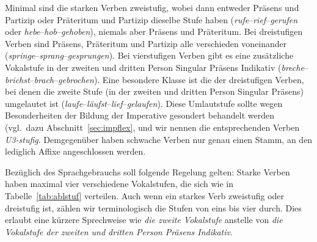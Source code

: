 Minimal sind die starken Verben zweistufig, wobei dann entweder Präsens und Partizip oder Präteritum und Partizip dieselbe Stufe haben (\textit{rufe}--\textit{rief}--\textit{gerufen} oder \textit{hebe}--\textit{hob}--\textit{gehoben}), niemals aber Präsens und Präteritum.
Bei dreistufigen Verben sind Präsens, Präteritum und Partizip alle verschieden voneinander (\textit{springe}--\textit{sprang}--\textit{gesprungen}).
Bei vierstufigen Verben gibt es eine zusätzliche Vokalstufe in der zweiten und dritten Person Singular Präsens Indikativ (\textit{breche}--\textit{brichst}--\textit{brach}--\textit{gebrochen}).
Eine besondere Klasse ist die der dreistufigen Verben, bei denen die zweite Stufe (in der zweiten und dritten Person Singular Präsens) umgelautet ist (\textit{laufe}--\textit{läufst}--\textit{lief}--\textit{gelaufen}).
Diese Umlautstufe sollte wegen Besonderheiten der Bildung der Imperative gesondert behandelt werden (vgl.\ dazu Abschnitt~\ref{sec:impflex}, und wir nennen die entsprechenden Verben \textit{U3-stufig}.
Demgegenüber haben schwache Verben nur genau einen Stamm, an den lediglich Affixe angeschlossen werden.



Bezüglich des Sprachgebrauchs soll folgende Regelung gelten:
Starke Verben haben maximal vier verschiedene Vokalstufen, die sich wie in Tabelle~\ref{tab:ablstuf} verteilen.
Auch wenn ein starkes Verb zweistufig oder dreistufig ist, zählen wir terminologisch die Stufen von eins bis vier durch.
Dies erlaubt eine kürzere Sprechweise wie \textit{die zweite Vokalstufe} anstelle von \textit{die Vokalstufe der zweiten und dritten Person Präsens Indikativ}.

\begin{table}
  \caption{Vokalstufen an Beispielen}
  \label{tab:ablstuf}
\end{table}

